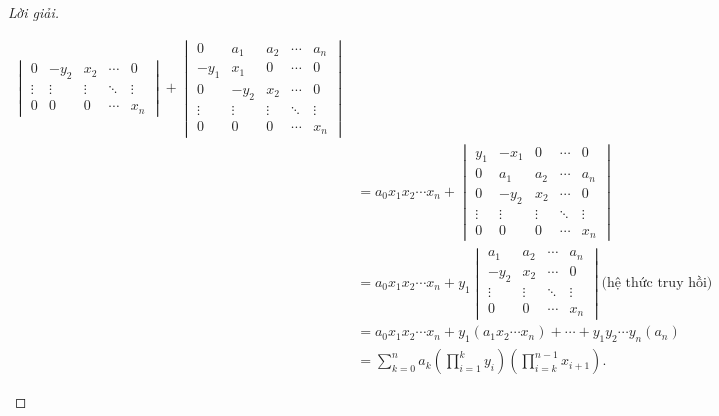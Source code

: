 \documentclass[class=linearalgebra,crop=false]{standalone}
\begin{document}
\begin{proof}[Lời giải]
\begin{enumerate}[label = (\alph*)]
\begin{align*}
\begin{vmatrix}
                      0      & -y_{2} & x_{2}  & \cdots & 0      \\
                      \vdots & \vdots & \vdots & \ddots & \vdots \\
                      0      & 0      & 0      & \cdots & x_{n}
                  \end{vmatrix}
                  +
                  \begin{vmatrix}
                      0      & a_{1}  & a_{2}  & \cdots & a_{n}  \\
                      -y_{1} & x_{1}  & 0      & \cdots & 0      \\
                      0      & -y_{2} & x_{2}  & \cdots & 0      \\
                      \vdots & \vdots & \vdots & \ddots & \vdots \\
                      0      & 0      & 0      & \cdots & x_{n}
                  \end{vmatrix}                                                         \\
                   & =
                  a_{0}x_{1}x_{2}\cdots x_{n}
                  +
                  \begin{vmatrix}
                      y_{1}  & -x_{1} & 0      & \cdots & 0      \\
                      0      & a_{1}  & a_{2}  & \cdots & a_{n}  \\
                      0      & -y_{2} & x_{2}  & \cdots & 0      \\
                      \vdots & \vdots & \vdots & \ddots & \vdots \\
                      0      & 0      & 0      & \cdots & x_{n}
                  \end{vmatrix}                                                         \\
                   & =
                  a_{0}x_{1}x_{2}\cdots x_{n}
                  +
                  y_{1}
                  \begin{vmatrix}
                      a_{1}  & a_{2}  & \cdots & a_{n}  \\
                      -y_{2} & x_{2}  & \cdots & 0      \\
                      \vdots & \vdots & \ddots & \vdots \\
                      0      & 0      & \cdots & x_{n}
                  \end{vmatrix} \text{(hệ thức truy hồi)}                                                            \\
                   & = a_{0}x_{1}x_{2}\cdots x_{n}
                  + y_{1} (a_{1}x_{2}\cdots x_{n})
                  + \cdots
                  + y_{1}y_{2}\cdots y_{n} (a_{n})                                                                   \\
                   & = \sum^{n}_{k=0} a_{k}\left(\prod^{k}_{i=1}y_{i}\right)\left(\prod^{n-1}_{i=k}x_{i + 1}\right).
              \end{align*}
    \end{enumerate}
\end{proof}
\end{document}
